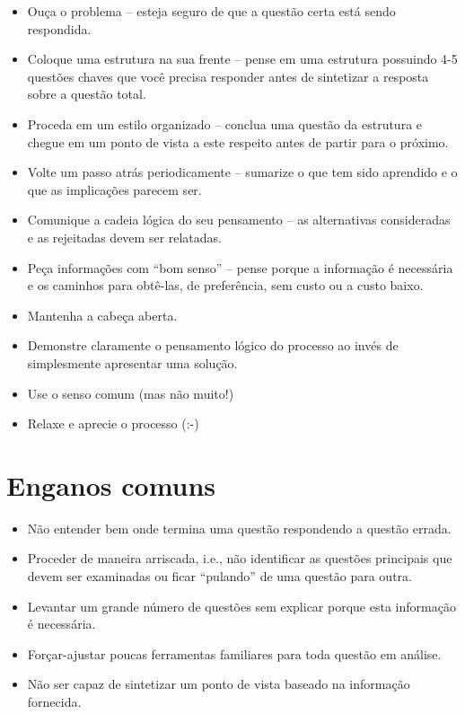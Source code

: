 \begin{itemize}
	\item  Ouça o problema -- esteja seguro de que a questão certa está sendo
	respondida.
	\item Coloque uma estrutura na sua frente -- pense em uma estrutura
	possuindo 4-5 questões chaves que você precisa responder antes de
	sintetizar a resposta sobre a questão total.
	\item  Proceda em um estilo organizado -- conclua uma questão da estrutura
	e chegue em um ponto de vista a este respeito antes de partir para o
	próximo.
	\item  Volte um passo atrás periodicamente -- sumarize o que tem sido
	aprendido e o que as implicações parecem ser.
	\item  Comunique a cadeia lógica do seu pensamento -- as alternativas
	consideradas e as rejeitadas devem ser relatadas.
	\item  Peça informações com ``bom senso'' -- pense porque a informação é
	necessária e os caminhos para obtê-las, de preferência, sem custo ou a
	custo baixo.
	\item  Mantenha a cabeça aberta.
	\item  Demonstre claramente o pensamento lógico do
	processo ao invés de simplesmente apresentar uma solução.
	\item  Use o senso comum (mas não muito!)
	\item  Relaxe e aprecie o processo (:-)
\end{itemize}

\section{Enganos comuns}

\begin{itemize}
	\item Não entender bem onde termina uma questão respondendo a questão
	errada.
	\item  Proceder de maneira arriscada, i.e., não identificar as questões
	principais que devem ser examinadas ou ficar ``pulando'' de uma
	questão para outra.
	\item Levantar um grande número de questões sem explicar porque esta
	informação é necessária.
	\item  Forçar-ajustar poucas ferramentas familiares para toda questão em
	análise.
	\item  Não ser capaz de sintetizar um ponto de vista baseado na informação
	fornecida.
\end{itemize}
